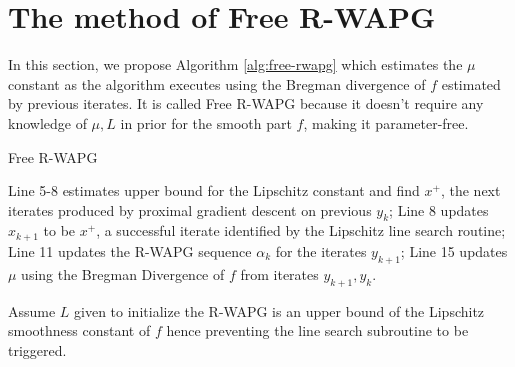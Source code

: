 \documentclass[12pt]{article}
\begin{document}
\section{The method of Free R-WAPG}\label{sec:free-rwapg}
    In this section, we propose Algorithm \ref{alg:free-rwapg} which estimates the $\mu$ constant as the algorithm executes using the Bregman divergence of $f$ estimated by previous iterates.
    It is called Free R-WAPG because it doesn't require any knowledge of $\mu, L$ in prior for the smooth part $f$, making it parameter-free.
    \begin{algorithm}
        \begin{algorithmic}[1]
        {\footnotesize
            \ENDWHILE
        \ENDFOR
        }
        \end{algorithmic}
        \caption{Free R-WAPG}
        \label{alg:free-rwapg}
    \end{algorithm}
    \par
    Line 5-8 estimates upper bound for the Lipschitz constant and find $x^+$, the next iterates produced by proximal gradient descent on previous $y_k$;
    Line 8 updates $x_{k + 1}$ to be $x^+$, a successful iterate identified by the Lipschitz line search routine;
    Line 11 updates the R-WAPG sequence $\alpha_k$ for the iterates $y_{k + 1}$;
    Line 15 updates $\mu$ using the Bregman Divergence of $f$ from iterates $y_{k + 1}, y_k$.
    \par
    Assume $L$ given to initialize the R-WAPG is an upper bound of the Lipschitz smoothness constant of $f$ hence preventing the line search subroutine to be triggered.
\end{document}
